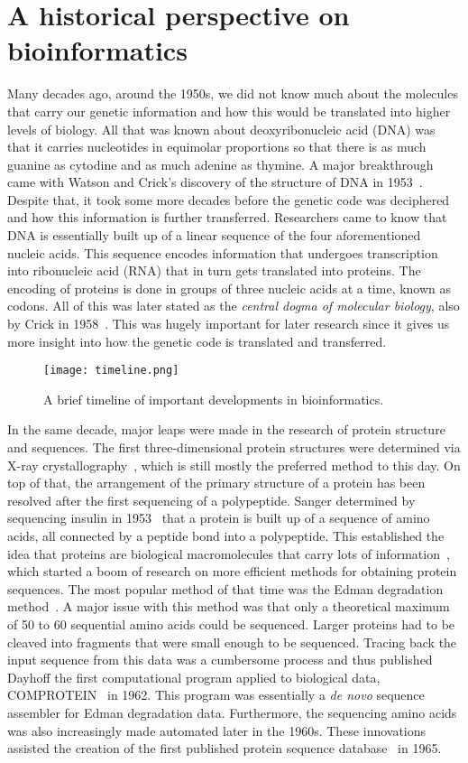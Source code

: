 \section{A historical perspective on bioinformatics}
Many decades ago, around the 1950s, we did not know much about the molecules that carry our genetic information and how this would be translated into higher levels of biology. All that was known about deoxyribonucleic acid (DNA) was that it carries nucleotides in equimolar proportions so that there is as much guanine as cytodine and as much adenine as thymine. A major breakthrough came with Watson and Crick's discovery of the structure of DNA in 1953~\cite{dnastruct}. Despite that, it took some more decades before the genetic code was deciphered and how this information is further transferred. Researchers came to know that DNA is essentially built up of a linear sequence of the four aforementioned nucleic acids. This sequence encodes information that undergoes transcription into ribonucleic acid (RNA) that in turn gets translated into proteins. The encoding of proteins is done in groups of three nucleic acids at a time, known as codons. All of this was later stated as the \textit{central dogma of molecular biology}, also by Crick in 1958~\cite{dogma}. This was hugely important for later research since it gives us more insight into how the genetic code is translated and transferred.
\begin{figure}[h]
    \centering
    \texttt{[image: timeline.png]}
    \caption{A brief timeline of important developments in bioinformatics.}
    \label{fig:timeline}
\end{figure}
In the same decade, major leaps were made in the research of protein structure and sequences. The first three-dimensional protein structures were determined via X-ray crystallography~\cite{xray}, which is still mostly the preferred method to this day. On top of that, the arrangement of the primary structure of a protein has been resolved after the first sequencing of a polypeptide. Sanger determined by sequencing insulin in 1953~\cite{insulin} that a protein is built up of a sequence of amino acids, all connected by a peptide bond into a polypeptide. This established the idea that proteins are biological macromolecules that carry lots of information~\cite{primstruct}, which started a boom of research on more efficient methods for obtaining protein sequences. The most popular method of that time was the Edman degradation method~\cite{edman}. A major issue with this method was that only a theoretical maximum of 50 to 60 sequential amino acids could be sequenced. Larger proteins had to be cleaved into fragments that were small enough to be sequenced. Tracing back the input sequence from this data was a cumbersome process and thus published Dayhoff the first computational program applied to biological data, COMPROTEIN~\cite{comprotein} in 1962. This program was essentially a \textit{de novo} sequence assembler for Edman degradation data. Furthermore, the sequencing amino acids was also increasingly made automated later in the 1960s. These innovations assisted the creation of the first published protein sequence database~\cite{atlas} in 1965.

